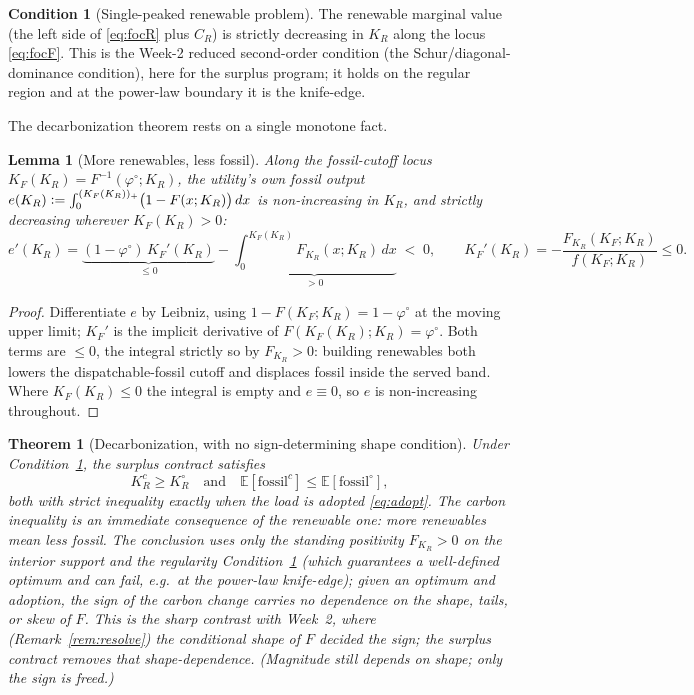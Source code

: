 \documentclass[11pt,reqno]{amsart}
\theoremstyle{plain}
\newtheorem{theorem}{Theorem}
\newtheorem{lemma}{Lemma}
\theoremstyle{definition}
\newtheorem{condition}{Condition}
\theoremstyle{remark}
\newcommand{\KR}{K_R}
\newcommand{\KF}{K_F}
\newcommand{\KRc}{K_R^{c}}
\newcommand{\KRo}{K_R^{\circ}}
\newcommand{\CR}{C_R}
\newcommand{\FKR}{F_{\!\KR}}
\newcommand{\E}{\mathbb{E}}
\newcommand{\eqdef}{\vcentcolon=}
\newcommand{\fossil}{\mathrm{fossil}}
\begin{document}
\begin{condition}[Single-peaked renewable problem]\label{cond:reg}
The renewable marginal value (the left side of \eqref{eq:focR} plus $\CR$) is strictly
decreasing in $\KR$ along the locus \eqref{eq:focF}. This is the Week-2 reduced
second-order condition (the Schur/diagonal-dominance condition), here for the
surplus program; it holds on the regular region and at the power-law boundary it is
the knife-edge.
\end{condition}

The decarbonization theorem rests on a single monotone fact.

\begin{lemma}[More renewables, less fossil]\label{lem:monofossil}
Along the fossil-cutoff locus $\KF(\KR)=F^{-1}(\varphi^{\circ};\KR)$, the utility's own
fossil output
$e(\KR)\eqdef\int_0^{(\KF(\KR))_+}\!\big(1-F(x;\KR)\big)\,dx$
is non-increasing in $\KR$, and strictly decreasing wherever $\KF(\KR)>0$:
\[
  e'(\KR)=\underbrace{(1-\varphi^{\circ})\,\KF'(\KR)}_{\le0}
  -\underbrace{\int_0^{\KF(\KR)}\!\FKR(x;\KR)\,dx}_{>0}\;<\;0,
  \qquad \KF'(\KR)=-\frac{\FKR(\KF;\KR)}{f(\KF;\KR)}\le0 .
\]
\end{lemma}
\begin{proof}
Differentiate $e$ by Leibniz, using $1-F(\KF;\KR)=1-\varphi^{\circ}$ at the moving upper
limit; $\KF'$ is the implicit derivative of $F(\KF(\KR);\KR)=\varphi^{\circ}$. Both terms
are $\le0$, the integral strictly so by $\FKR>0$: building renewables both lowers the
dispatchable-fossil cutoff and displaces fossil inside the served band. Where
$\KF(\KR)\le0$ the integral is empty and $e\equiv0$, so $e$ is non-increasing throughout.
\end{proof}

\begin{theorem}[Decarbonization, with no sign-determining shape condition]\label{thm:decarb}
Under Condition~\ref{cond:reg}, the surplus contract satisfies
\[
  \boxed{\;\KRc\ge\KRo\quad\text{and}\quad \E[\fossil^{c}]\le\E[\fossil^{\circ}],\;}
\]
both with \emph{strict} inequality exactly when the load is adopted \eqref{eq:adopt}. The
carbon inequality is an immediate consequence of the renewable one: \emph{more renewables
mean less fossil}. The conclusion uses only the standing positivity $\FKR>0$ on the
interior support and the regularity Condition~\ref{cond:reg} (which guarantees a
well-defined optimum and can fail, e.g.\ at the power-law knife-edge); given an optimum
and adoption, the \emph{sign} of the carbon change carries \emph{no} dependence on the
shape, tails, or skew of $F$. This is the sharp contrast with Week~2, where
(Remark~\ref{rem:resolve}) the conditional shape of $F$ decided the sign; the surplus
contract removes that shape-dependence. (Magnitude still depends on shape; only the sign
is freed.)
\end{theorem}
\end{document}
